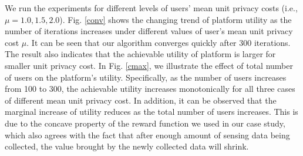 We run the experiments for different levels of users' mean unit privacy costs (i.e., $\mu=1.0, 1.5, 2.0$). Fig. \ref{conv} shows the changing trend of platform utility as the number of iterations increases under different values of user's mean unit privacy cost $\mu$. It can be seen that our algorithm converges quickly after 300 iterations. The result also indicates that the achievable utility of platform is larger for smaller unit privacy cost. In Fig. \ref{cmax}, we illustrate the effect of total number of users on the platform's utility. Specifically, as the number of users increases from 100 to 300, the achievable utility increases monotonically for all three cases of different mean unit privacy cost. In addition, it can be observed that the marginal increase of utility reduces as the total number of users increases. This is due to the concave property of the reward function we used in our case study, which also agrees with the fact that after enough amount of sensing data being collected, the value brought by the newly collected data will shrink.



